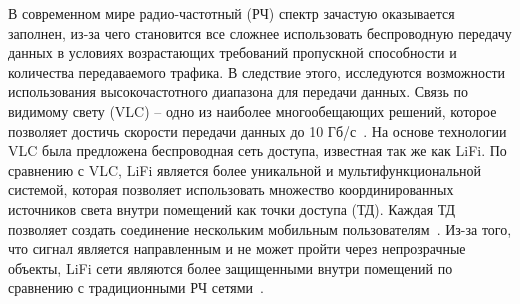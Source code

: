 \Introduction


В современном мире радио-частотный (РЧ) спектр зачастую оказывается заполнен, из-за чего становится все сложнее использовать беспроводную передачу данных в условиях возрастающих требований пропускной способности и количества передаваемого трафика. В следствие этого, исследуются возможности использования высокочастотного диапазона для передачи данных. Связь по видимому свету (VLC) \--- одно из наиболее многообещающих решений, которое позволяет достичь скорости передачи данных до 10 Гб/с~\cite{Carreira2020}. На основе технологии VLC была предложена беспроводная сеть доступа, известная так же как LiFi. По сравнению с VLC, LiFi является более уникальной и мультифункциональной системой, которая позволяет использовать множество координированных источников света внутри помещений как точки доступа (ТД). Каждая ТД позволяет создать соединение нескольким мобильным пользователям~\cite{Haas16}. Из-за того, что сигнал является направленным и не может пройти через непрозрачные объекты, LiFi сети являются более защищенными внутри помещений по сравнению с традиционными РЧ сетями~\cite{Cho2018}.